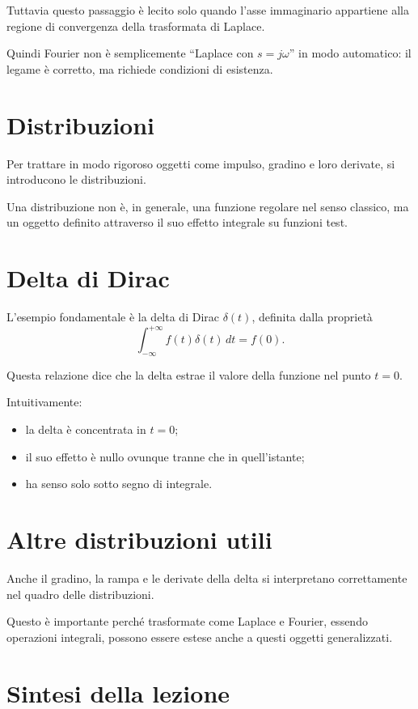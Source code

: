 Tuttavia questo passaggio è lecito solo quando l'asse immaginario appartiene
alla regione di convergenza della trasformata di Laplace.

Quindi Fourier non è semplicemente ``Laplace con \(s=j\omega\)''
in modo automatico: il legame è corretto, ma richiede condizioni di esistenza.

\section{Distribuzioni}

Per trattare in modo rigoroso oggetti come impulso, gradino e loro derivate,
si introducono le distribuzioni.

Una distribuzione non è, in generale, una funzione regolare nel senso classico,
ma un oggetto definito attraverso il suo effetto integrale su funzioni test.

\section{Delta di Dirac}

L'esempio fondamentale è la delta di Dirac \(\delta(t)\), definita dalla proprietà
\[
\int_{-\infty}^{+\infty} f(t)\delta(t)\,dt = f(0).
\]

Questa relazione dice che la delta estrae il valore della funzione nel punto \(t=0\).

Intuitivamente:
\begin{itemize}
    \item la delta è concentrata in \(t=0\);
    \item il suo effetto è nullo ovunque tranne che in quell'istante;
    \item ha senso solo sotto segno di integrale.
\end{itemize}

\section{Altre distribuzioni utili}

Anche il gradino, la rampa e le derivate della delta
si interpretano correttamente nel quadro delle distribuzioni.

Questo è importante perché trasformate come Laplace e Fourier,
essendo operazioni integrali, possono essere estese anche a questi oggetti generalizzati.

\section{Sintesi della lezione}

